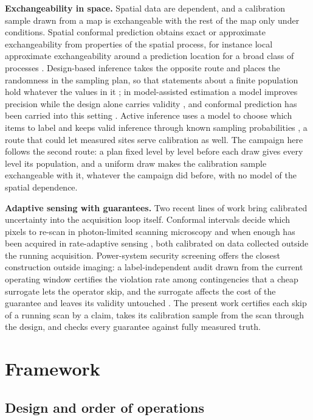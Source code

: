 \documentclass{iopjournal}
\begin{document}
\textbf{Exchangeability in space.} Spatial data are dependent, and a calibration sample drawn from a map is exchangeable with the rest of the map only under conditions. Spatial conformal prediction obtains exact or approximate exchangeability from properties of the spatial process, for instance local approximate exchangeability around a prediction location for a broad class of processes \cite{Mao2024}. Design-based inference takes the opposite route and places the randomness in the sampling plan, so that statements about a finite population hold whatever the values in it \cite{Neyman1934,Cochran1977}; in model-assisted estimation a model improves precision while the design alone carries validity \cite{Sarndal1992}, and conformal prediction has been carried into this setting \cite{Vovk2013,Wieczorek2023}. Active inference uses a model to choose which items to label and keeps valid inference through known sampling probabilities \cite{ZrnicCandes2024}, a route that could let measured sites serve calibration as well. The campaign here follows the second route: a plan fixed level by level before each draw gives every level its population, and a uniform draw makes the calibration sample exchangeable with it, whatever the campaign did before, with no model of the spatial dependence.

\textbf{Adaptive sensing with guarantees.} Two recent lines of work bring calibrated uncertainty into the acquisition loop itself. Conformal intervals decide which pixels to re-scan in photon-limited scanning microscopy \cite{Ye2025} and when enough has been acquired in rate-adaptive sensing \cite{YangZhang2026}, both calibrated on data collected outside the running acquisition. Power-system security screening offers the closest construction outside imaging: a label-independent audit drawn from the current operating window certifies the violation rate among contingencies that a cheap surrogate lets the operator skip, and the surrogate affects the cost of the guarantee and leaves its validity untouched \cite{Manoharan2026}. The present work certifies each skip of a running scan by a claim, takes its calibration sample from the scan through the design, and checks every guarantee against fully measured truth.

\hypertarget{sec:3}{%
\section{Framework}\label{sec:3}}

\hypertarget{sec:3-1}{%
\subsection{Design and order of operations}\label{sec:3-1}}
\end{document}
